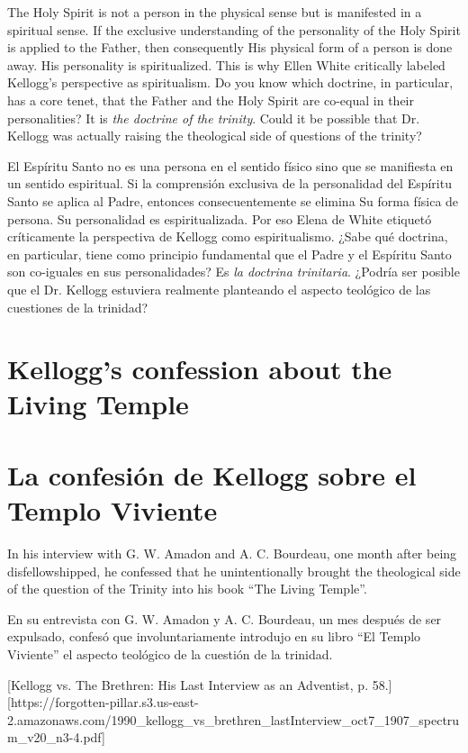The Holy Spirit is not a person in the physical sense but is manifested in a spiritual sense. If the exclusive understanding of the personality of the Holy Spirit is applied to the Father, then consequently His physical form of a person is done away. His personality is spiritualized. This is why Ellen White critically labeled Kellogg's perspective as spiritualism. Do you know which doctrine, in particular, has a core tenet, that the Father and the Holy Spirit are co-equal in their personalities? It is \textit{the doctrine of the trinity}. Could it be possible that Dr. Kellogg was actually raising the theological side of questions of the trinity?


El Espíritu Santo no es una persona en el sentido físico sino que se manifiesta en un sentido espiritual. Si la comprensión exclusiva de la personalidad del Espíritu Santo se aplica al Padre, entonces consecuentemente se elimina Su forma física de persona. Su personalidad es espiritualizada. Por eso Elena de White etiquetó críticamente la perspectiva de Kellogg como espiritualismo. ¿Sabe qué doctrina, en particular, tiene como principio fundamental que el Padre y el Espíritu Santo son co-iguales en sus personalidades? Es \textit{la doctrina trinitaria}. ¿Podría ser posible que el Dr. Kellogg estuviera realmente planteando el aspecto teológico de las cuestiones de la trinidad?


\section*{Kellogg’s confession about the Living Temple}


\section*{La confesión de Kellogg sobre el Templo Viviente}


In his interview with G. W. Amadon and A. C. Bourdeau, one month after being disfellowshipped, he confessed that he unintentionally brought the theological side of the question of the Trinity into his book “The Living Temple”.


En su entrevista con G. W. Amadon y A. C. Bourdeau, un mes después de ser expulsado, confesó que involuntariamente introdujo en su libro “El Templo Viviente” el aspecto teológico de la cuestión de la trinidad.


[Kellogg vs. The Brethren: His Last Interview as an Adventist, p. 58.][https://forgotten-pillar.s3.us-east-2.amazonaws.com/1990\_kellogg\_vs\_brethren\_lastInterview\_oct7\_1907\_spectrum\_v20\_n3-4.pdf]


